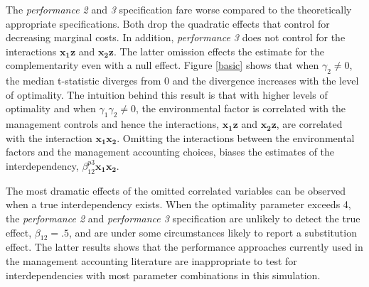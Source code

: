 \documentclass[12pt]{article}
\begin{document}
The \emph{performance 2} and \emph{3} specification fare worse compared
to the theoretically appropriate specifications. Both drop the quadratic
effects that control for decreasing marginal costs. In addition,
\emph{performance 3} does not control for the interactions
\(\mathbf{x_1z}\) and \(\mathbf{x_2z}\). The latter omission effects the
estimate for the complementarity even with a null effect. Figure
\ref{basic} shows that when \(\gamma_2 \neq 0\), the median t-statistic
diverges from 0 and the divergence increases with the level of
optimality. The intuition behind this result is that with higher levels
of optimality and when \(\gamma_1 \gamma_2 \neq 0\), the environmental
factor is correlated with the management controls and hence the
interactions, \(\mathbf{x_1z}\) and \(\mathbf{x_2z}\), are correlated
with the interaction \(\mathbf{x_1 x_2}\). Omitting the interactions
between the environmental factors and the management accounting choices,
biases the estimates of the interdependency,
\(\beta_{12}^{p3} \mathbf{x_1 x_2}\).

The most dramatic effects of the omitted correlated variables can be
observed when a true interdependency exists. When the optimality
parameter exceeds 4, the \emph{performance 2} and \emph{performance 3}
specification are unlikely to detect the true effect,
\(\beta_{12} = .5\), and are under some circumstances likely to report a
substitution effect. The latter results shows that the performance
approaches currently used in the management accounting literature are
inappropriate to test for interdependencies with most parameter
combinations in this simulation.
\end{document}
